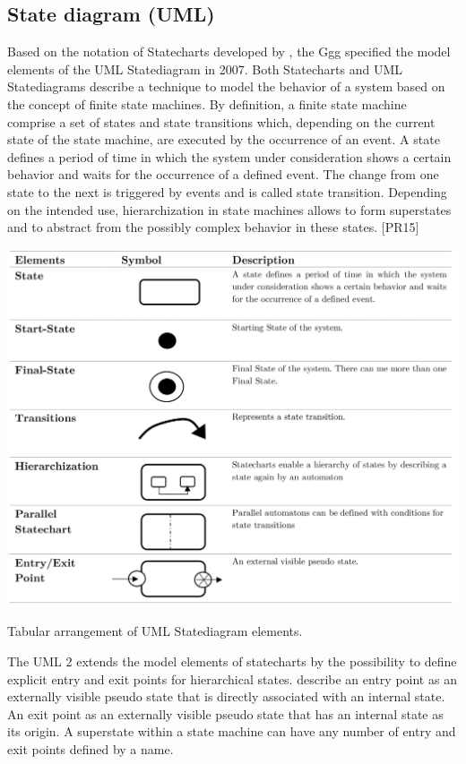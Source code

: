 \newpage
\subsection{State diagram (UML)}
Based on the notation of Statecharts developed by \cite{DavidHarel.1987}, the \gls{Ggg} specified the model elements of the UML Statediagram in 2007. Both Statecharts and UML Statediagrams describe a technique to model the behavior of a system based on the concept of finite state machines. By definition, a finite state machine comprise a set of states and state transitions which, depending on the current state of the state machine, are executed by the occurrence of an event. A state defines a period of time in which the system under consideration shows a certain behavior and waits for the occurrence of a defined event. The change from one state to the next is triggered by events and is called state transition. Depending on the intended use, hierarchization in state machines allows to form superstates and to abstract from the possibly complex behavior in these states. [PR15] \\

\begin{table}[!hb]
	\centering
	\label{tbl:TableLatexShortened}
	\includegraphics[scale=0.3]{statechart-1}
	\caption{Tabular arrangement of UML Statediagram elements.}
\end{table}

The UML 2 extends the model elements of statecharts by the possibility to define explicit entry and exit points for hierarchical states. \cite{Rumbaugh.1999} describe an entry point as an externally visible pseudo state that is directly associated with an internal state. An exit point as an externally visible pseudo state that has an internal state as its origin. A superstate within a state machine can have any number of entry and exit points defined by a name.

